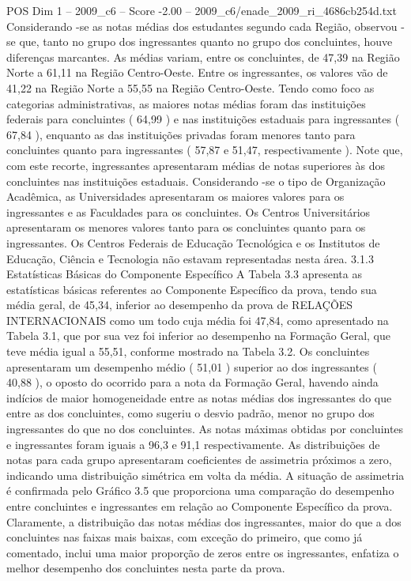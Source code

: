 \begin{textsample}{POS Dim 1 – 2009\_c6 – Score -2.00 – 2009\_c6/enade\_2009\_ri\_4686cb254d.txt}
Considerando -se as notas médias dos estudantes segundo cada Região, observou -se que, tanto no grupo dos ingressantes quanto no grupo dos concluintes, houve diferenças marcantes.
As médias variam, entre os concluintes, de 47,39 na Região Norte a 61,11 na Região Centro-Oeste.
Entre os ingressantes, os valores vão de 41,22 na Região Norte a 55,55 na Região Centro-Oeste.
Tendo como foco as categorias administrativas, as maiores notas médias foram das instituições federais para concluintes ( 64,99 ) e nas instituições estaduais para ingressantes ( 67,84 ), enquanto as das instituições privadas foram menores tanto para concluintes quanto para ingressantes ( 57,87 e 51,47, respectivamente ).
Note que, com este recorte, ingressantes apresentaram médias de notas superiores às dos concluintes nas instituições estaduais.
Considerando -se o tipo de Organização Acadêmica, as Universidades apresentaram os maiores valores para os ingressantes e as Faculdades para os concluintes.
Os Centros Universitários apresentaram os menores valores tanto para os concluintes quanto para os ingressantes.
Os Centros Federais de Educação Tecnológica e os Institutos de Educação, Ciência e Tecnologia não estavam representadas nesta área. 3.1.3 Estatísticas Básicas do Componente Específico A Tabela 3.3 apresenta as estatísticas básicas referentes ao Componente Específico da prova, tendo sua média geral, de 45,34, inferior ao desempenho da prova de RELAÇÕES INTERNACIONAIS como um todo cuja média foi 47,84, como apresentado na Tabela 3.1, que por sua vez foi inferior ao desempenho na Formação Geral, que teve média igual a 55,51, conforme mostrado na Tabela 3.2.
Os concluintes apresentaram um desempenho médio ( 51,01 ) superior ao dos ingressantes ( 40,88 ), o oposto do ocorrido para a nota da Formação Geral, havendo ainda indícios de maior homogeneidade entre as notas médias dos ingressantes do que entre as dos concluintes, como sugeriu o desvio padrão, menor no grupo dos ingressantes do que no dos concluintes.
As notas máximas obtidas por concluintes e ingressantes foram iguais a 96,3 e 91,1 respectivamente.
As distribuições de notas para cada grupo apresentaram coeficientes de assimetria próximos a zero, indicando uma distribuição simétrica em volta da média.
A situação de assimetria é confirmada pelo Gráfico 3.5 que proporciona uma comparação do desempenho entre concluintes e ingressantes em relação ao Componente Específico da prova.
Claramente, a distribuição das notas médias dos ingressantes, maior do que a dos concluintes nas faixas mais baixas, com exceção do primeiro, que como já comentado, inclui uma maior proporção de zeros entre os ingressantes, enfatiza o melhor desempenho dos concluintes nesta parte da prova.

\end{textsample}

